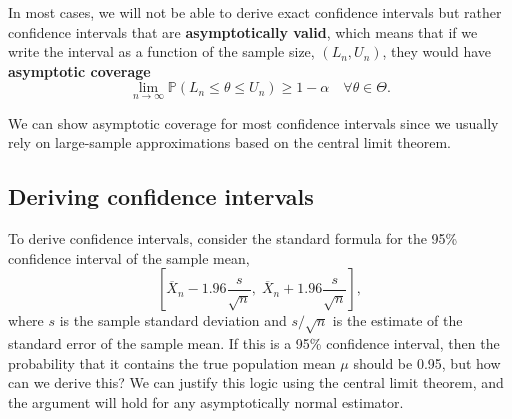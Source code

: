 \documentclass[
  13pt,
  letterpaper,
  DIV=11,
  numbers=noendperiod]{scrreprt}
\renewcommand{\P}{\mathbb{P}}
\newcommand{\Xbar}{\overline{X}}
\theoremstyle{plain}
\theoremstyle{definition}
\theoremstyle{definition}
\theoremstyle{remark}
\begin{document}
In most cases, we will not be able to derive exact confidence intervals
but rather confidence intervals that are \textbf{asymptotically valid},
which means that if we write the interval as a function of the sample
size, \((L_n, U_n)\), they would have \textbf{asymptotic coverage} \[
\lim_{n\to\infty} \P(L_n \leq \theta \leq U_n) \geq 1-\alpha \quad\forall\theta\in\Theta.
\]

We can show asymptotic coverage for most confidence intervals since we
usually rely on large-sample approximations based on the central limit
theorem.

\subsection{Deriving confidence
intervals}\label{deriving-confidence-intervals}

To derive confidence intervals, consider the standard formula for the
95\% confidence interval of the sample mean, \[ 
\left[\Xbar_n - 1.96\frac{s}{\sqrt{n}},\; \Xbar_n + 1.96\frac{s}{\sqrt{n}}\right],
\] where \(s\) is the sample standard deviation and \(s/\sqrt{n}\) is
the estimate of the standard error of the sample mean. If this is a 95\%
confidence interval, then the probability that it contains the true
population mean \(\mu\) should be 0.95, but how can we derive this? We
can justify this logic using the central limit theorem, and the argument
will hold for any asymptotically normal estimator.
\end{document}
